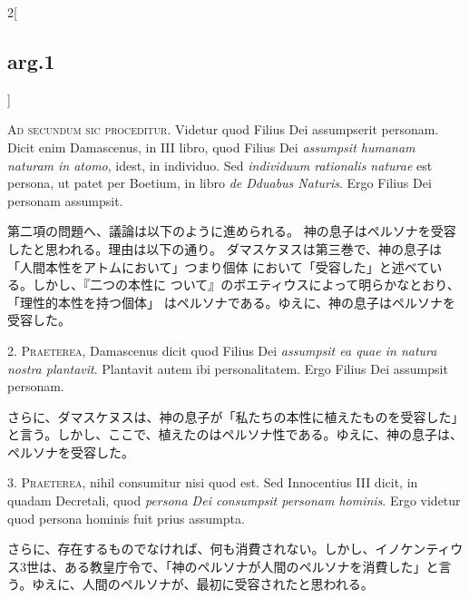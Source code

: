 \documentclass[paper=a4paper,fontsize=10pt,jafontsize=9pt,titlepage]{jlreq}
\begin{document}
\begin{paracol}{2}[\subsection{arg.1}]

{\Huge A}{\scshape d secundum sic proceditur}. Videtur quod Filius Dei assumpserit
personam. Dicit enim Damascenus, in III libro, quod Filius Dei {\itshape assumpsit
humanam naturam in atomo}, idest, in individuo. Sed {\itshape individuum rationalis
naturae} est persona, ut patet per Boetium, in libro {\itshape de Dduabus
Naturis}. Ergo Filius Dei personam assumpsit.

\switchcolumn

第二項の問題へ、議論は以下のように進められる。
神の息子はペルソナを受容したと思われる。理由は以下の通り。
ダマスケヌスは第三巻で、神の息子は「人間本性をアトムにおいて」つまり個体
 において「受容した」と述べている。しかし、『二つの本性に
 ついて』のボエティウスによって明らかなとおり、「理性的本性を持つ個体」
 はペルソナである。ゆえに、神の息子はペルソナを受容した。


2. {\scshape Praeterea}, Damascenus dicit quod Filius Dei {\itshape assumpsit ea quae in natura
nostra plantavit}. Plantavit autem ibi personalitatem. Ergo Filius Dei
assumpsit personam.

\switchcolumn

さらに、ダマスケヌスは、神の息子が「私たちの本性に植えたものを受容した」
 と言う。しかし、ここで、植えたのはペルソナ性である。ゆえに、神の息子は、
 ペルソナを受容した。


3. {\scshape Praeterea}, nihil consumitur nisi quod est. Sed Innocentius III dicit, in
quadam Decretali, quod {\itshape persona Dei consumpsit personam hominis}. Ergo
videtur quod persona hominis fuit prius assumpta.

\switchcolumn

さらに、存在するものでなければ、何も消費されない。しかし、イノケンティウ
 ス3世は、ある教皇庁令で、「神のペルソナが人間のペルソナを消費した」と言
 う。ゆえに、人間のペルソナが、最初に受容されたと思われる。


\end{paracol}
\end{document}
